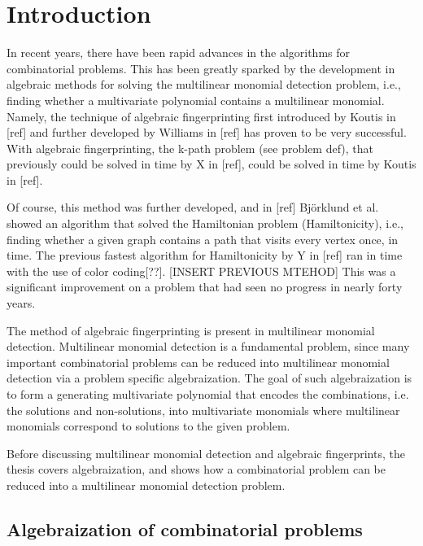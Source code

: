 
\section{Introduction}

In recent years, there have been rapid advances in the algorithms for combinatorial problems. 
This has been greatly sparked by the development in algebraic methods for solving the 
multilinear monomial detection problem, i.e., finding whether a multivariate polynomial contains a multilinear monomial. 
Namely, the technique of algebraic fingerprinting 
first introduced by Koutis in [ref] and further developed by Williams in [ref] has proven 
to be very successful. With algebraic fingerprinting, the k-path problem (see problem def), 
that previously could be solved in  time by X in [ref], 
could be solved in  time by Koutis in [ref].\nl

Of course, this method was further developed, and in [ref] Björklund et al. showed an algorithm 
that solved the Hamiltonian problem (Hamiltonicity), i.e., finding whether a given graph contains a path that visits 
every vertex once, in  time. The previous fastest algorithm for Hamiltonicity by Y 
in [ref] ran in  time with the use of color coding[??]. [INSERT PREVIOUS MTEHOD] 
This was a significant improvement on a problem that had seen no progress in nearly forty years.\nl

The method of algebraic fingerprinting is present in multilinear monomial detection. Multilinear monomial detection 
is a fundamental problem, since many important combinatorial problems can be reduced into multilinear monomial detection 
via a problem specific algebraization. The goal of such algebraization is to form a generating multivariate polynomial 
that encodes the combinations, i.e. the solutions and non-solutions, into multivariate monomials where 
multilinear monomials correspond to solutions to the given problem.\nl

Before discussing multilinear monomial detection and algebraic fingerprints, the thesis covers algebraization, and 
shows how a combinatorial problem can be reduced into a multilinear monomial detection problem. 

\subsection{Algebraization of combinatorial problems}

